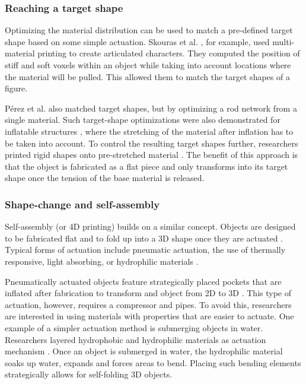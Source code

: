 \subsubsection{Reaching a target shape}
Optimizing the material distribution can be used to match a pre-defined target shape based on some simple actuation. Skouras et al. \cite{Skouras2013a}, for example, used multi-material printing to create articulated characters. They computed the position of stiff and soft voxels within an object while taking into account locations where the material will be pulled. This allowed them to match the target shapes of a figure. {P{\'{e}}rez et al. \cite{Perez2015} also matched target shapes, but by optimizing a rod network from a single material. Such target-shape optimizations were also demonstrated for inflatable structures \cite{Skouras2012}, where the stretching of the material after inflation has to be taken into account. To control the resulting target shapes further, researchers printed rigid shapes onto pre-stretched material \cite{Perez2017, Guseinov2017}. The benefit of this approach is that the object is fabricated as a flat piece and only transforms into its target shape once the tension of the base material is released. 


\subsubsection{Shape-change and self-assembly}
Self-assembly (or 4D printing) builds on a similar concept. Objects are designed to be fabricated flat and to fold up into a 3D shape once they are actuated \cite{Tibbits2014, Raviv2015}. Typical forms of actuation include pneumatic actuation, the use of thermally responsive, light absorbing, or hydrophilic materials \cite{Geryak2014, VanManen2018}. 

Pneumatically actuated objects feature strategically placed pockets that are inflated after fabrication to transform and object from 2D to 3D \cite{Ou2016, Overvelde2016a}. This type of actuation, however, requires a compressor and pipes. To avoid this, researchers are interested in using materials with properties that are easier to actuate. One example of a simpler actuation method is submerging objects in water. Researchers layered hydrophobic and hydrophilic materials as actuation mechanism \cite{Raviv2015, Wang2017}. Once an object is submerged in water, the hydrophilic material soaks up water, expands and forces areas to bend. Placing such bending elements strategically allows for self-folding 3D objects.

}
